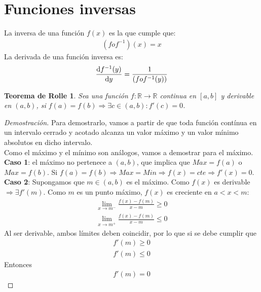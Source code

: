 \documentclass{article}
\newtheorem{rolle}{Teorema de Rolle}[section]
\begin{document}
\section{Funciones inversas}
La inversa de una función $f(x)$ es la que cumple que:
\begin{equation}
    \begin{split}
        (fof^{-1})(x)=x
    \end{split}
\end{equation}
La derivada de una función inversa es:
\begin{equation}
    \begin{split}
        \dv{f^{-1}(y)}{y}= \frac{1}{(fof^{-1}(y))}
    \end{split}
\end{equation}
\begin{rolle}
    Sea una función $f: \mathbb{R} \to \mathbb{R}$ continua en $[a,b]$ y derivable en $(a,b)$, si
    $f(a)=f(b)\Rightarrow \exists c \in (a,b): f'(c)=0$. 
\end{rolle}
\begin{proof}[Demostración]
    Para demostrarlo, vamos a partir de que toda función contínua en un intervalo cerrado y acotado
    alcanza un valor máximo y un valor mínimo absolutos en dicho intervalo.\\
    Como el máximo y el mínimo son análogos, vamos a demostrar para el máximo.\\
    \textbf{Caso 1}: el máximo no pertenece a $(a,b)$, que implica que $Max=f(a)$ o $Max=f(b)$. Si
    $f(a)=f(b)\Rightarrow Max=Min \Rightarrow f(x)=cte\Rightarrow f'(x)=0$.
    \textbf{Caso 2}: Supongamos que $m\in (a,b)$ es el máximo. Como $f(x)$ es derivable $\Rightarrow \exists f'(m)$.
    Como $m$ es un punto máximo, $f(x)$ es creciente en $a<x<m$:
    \begin{equation}
        \begin{split}
            \lim_{x \to m^-} \frac{f(x)-f(m)}{x-m}\geq 0\\
            \lim_{x \to m^+} \frac{f(x)-f(m)}{x-m}\leq 0
        \end{split}
    \end{equation}
    Al ser derivable, ambos límites deben coincidir, por lo que si se debe cumplir que
    \begin{equation}
        \begin{split}
            f'(m)\geq 0\\
            f'(m)\leq 0
        \end{split}
    \end{equation}
    Entonces
    \begin{equation}
        \begin{split}
            f'(m)=0
        \end{split}
    \end{equation}
\end{proof}
\end{document}
